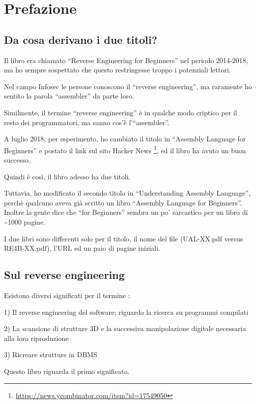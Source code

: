 \section*{Prefazione}

\subsection*{Da cosa derivano i due titoli?}
\label{TwoTitles}

Il libro era chiamato ``Reverse Engineering for Beginners'' nel periodo 2014-2018, ma ho sempre sospettato che questo restringesse troppo i potenziali lettori.

Nel campo Infosec le persone conoscono il ``reverse engineering'', ma raramente ho sentito la parola ``assembler'' da parte loro.

Similmente, il termine ``reverse engineering'' è in qualche modo criptico per il resto dei programmatori, ma sanno cos'è l'``assembler''.

A luglio 2018, per esperimento, ho cambiato il titolo in ``Assembly Language for Beginners''
e postato il link sul sito Hacker News \footnote{\url{https://news.ycombinator.com/item?id=17549050}}, ed il libro ha avuto un buon successo.

Quindi è così, il libro adesso ha due titoli.

Tuttavia, ho modificato il secondo titolo in ``Understanding Assembly Language'', perchè qualcuno aveva già scritto un libro ``Assembly Language for Beginners''.
Inoltre la gente dice che ``for Beginners'' sembra un po' sarcastico per un libro di \textasciitilde{}1000 pagine.

I due libri sono differenti solo per il titolo, il nome del file (UAL-XX.pdf versus RE4B-XX.pdf), l'URL ed un paio di pagine iniziali.

\subsection*{Sul reverse engineering}

Esistono diversi significati per il termine :

1) Il reverse engineering del software; riguardo la ricerca su programmi compilati

2) La scansione di strutture 3D e la successiva manipolazione digitale necessaria alla loro riproduzione

3) Ricreare strutture in \ac{DBMS}

Questo libro riguarda il primo significato.

